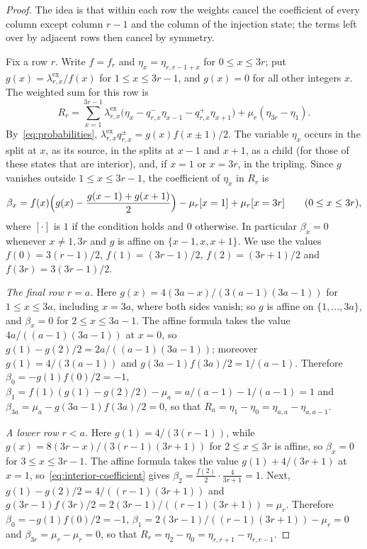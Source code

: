 \begin{proof}
The idea is that within each row the weights cancel the coefficient of
every column except column \(r-1\) and the column of the injection state;
the terms left over by adjacent rows then cancel by symmetry.

Fix a row \(r\). Write \(f=f_r\) and \(\eta_x=\eta_{r,r-1+x}\) for
\(0\le x\le3r\); put \(g(x)=\lambda^{\mathrm{ex}}_{r,x}/f(x)\) for
\(1\le x\le3r-1\), and \(g(x)=0\) for all other integers \(x\). The
weighted sum for this row is
\[
 R_r=\sum_{x=1}^{3r-1}\lambda^{\mathrm{ex}}_{r,x}
 \bigl(\eta_x-q^-_{r,x}\eta_{x-1}-q^+_{r,x}\eta_{x+1}\bigr)
 +\mu_r(\eta_{3r}-\eta_1).
\]
By~\eqref{eq:probabilities},
\(\lambda^{\mathrm{ex}}_{r,x}q^\pm_{r,x}=g(x)f(x\pm1)/2\). The variable
\(\eta_x\) occurs in the split at \(x\), as its source, in the splits at
\(x-1\) and \(x+1\), as a child (for those of these states that are
interior), and, if \(x=1\) or \(x=3r\), in the tripling. Since \(g\)
vanishes outside \(1\le x\le3r-1\), the coefficient of \(\eta_x\) in
\(R_r\) is
\begin{equation}\label{eq:interior-coefficient}
 \beta_x=f(x)\Bigl(g(x)-\frac{g(x-1)+g(x+1)}2\Bigr)
 -\mu_r[x=1]+\mu_r[x=3r]
 \qquad(0\le x\le3r),
\end{equation}
where \([\cdot]\) is \(1\) if the condition holds and \(0\) otherwise.
In particular
\(\beta_x=0\) whenever \(x\ne1,3r\) and \(g\) is affine on
\(\{x-1,x,x+1\}\). We use the values \(f(0)=3(r-1)/2\),
\(f(1)=(3r-1)/2\), \(f(2)=(3r+1)/2\) and \(f(3r)=3(3r-1)/2\).

\emph{The final row \(r=a\).} Here \(g(x)=4(3a-x)/(3(a-1)(3a-1))\) for
\(1\le x\le3a\), including \(x=3a\), where both sides vanish; so \(g\) is
affine on \(\{1,\ldots,3a\}\), and \(\beta_x=0\) for
\(2\le x\le3a-1\). The affine formula takes the value
\(4a/((a-1)(3a-1))\) at \(x=0\), so \(g(1)-g(2)/2=2a/((a-1)(3a-1))\);
moreover \(g(1)=4/(3(a-1))\) and \(g(3a-1)f(3a)/2=1/(a-1)\). Therefore
\(\beta_0=-g(1)f(0)/2=-1\),
\(\beta_1=f(1)(g(1)-g(2)/2)-\mu_a=a/(a-1)-1/(a-1)=1\) and
\(\beta_{3a}=\mu_a-g(3a-1)f(3a)/2=0\), so that
\(R_a=\eta_1-\eta_0=\eta_{a,a}-\eta_{a,a-1}\).

\emph{A lower row \(r<a\).} Here \(g(1)=4/(3(r-1))\), while
\(g(x)=8(3r-x)/(3(r-1)(3r+1))\) for \(2\le x\le3r\) is affine, so
\(\beta_x=0\) for \(3\le x\le3r-1\). The affine formula takes the value
\(g(1)+4/(3r+1)\) at \(x=1\), so~\eqref{eq:interior-coefficient} gives
\(\beta_2=\frac{f(2)}2\cdot\frac4{3r+1}=1\). Next,
\(g(1)-g(2)/2=4/((r-1)(3r+1))\) and
\(g(3r-1)f(3r)/2=2(3r-1)/((r-1)(3r+1))=\mu_r\). Therefore
\(\beta_0=-g(1)f(0)/2=-1\),
\(\beta_1=2(3r-1)/((r-1)(3r+1))-\mu_r=0\) and
\(\beta_{3r}=\mu_r-\mu_r=0\), so that
\(R_r=\eta_2-\eta_0=\eta_{r,r+1}-\eta_{r,r-1}\).


\end{proof}
